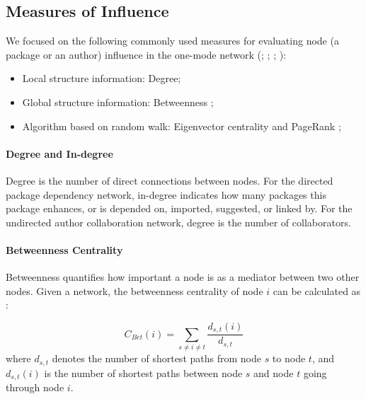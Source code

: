 \subsection{Measures of Influence}

We focused on the following commonly used measures for evaluating node (a package or an author) influence in the one-mode network (\citealp{jain2020identification}; \citealp{morone2015influence}; \citealp{salavaty2020integrated}; \citealp{wang2017ranking}): 

\begin{itemize}
	\item Local structure information: Degree;
	\item Global structure information: Betweenness \citep{freeman1978centrality};
	\item Algorithm based on random walk: Eigenvector centrality \citep{bonacich1972factoring} and PageRank \citep{page1999pagerank};
\end{itemize}

\paragraph{Degree and In-degree}

Degree is the number of direct connections between nodes. For the directed package dependency network, in-degree indicates how many packages this package enhances, or is depended on, imported, suggested, or linked by.  For the undirected author collaboration network, degree is the number of collaborators.

\paragraph{Betweenness Centrality}

Betweenness quantifies how important a node is as a mediator between two other nodes. Given a network, the betweenness centrality of node $i$ can be calculated as \citep{freeman1978centrality}:

\begin{equation}
C_{Bet}(i)= \sum_{s\neq i \neq t} \frac{d_{s,t}(i)}{d_{s,t}}
\end{equation}
where $d_{s,t}$ denotes the number of shortest paths from node $s$ to node $t$, and $d_{s,t}(i)$ is the number of shortest paths between node $s$ and node $t$ going through node $i$. %



